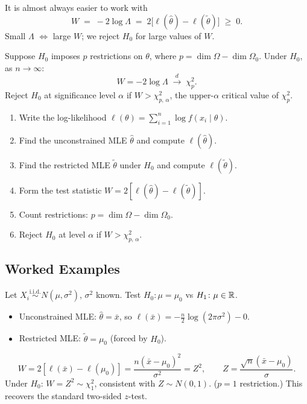 \documentclass[11pt, a4paper]{article}
\newcommand{\iid}{\overset{\text{i.i.d.}}{\sim}}
\newcommand{\dconv}{\overset{d}{\longrightarrow}}
\newcommand{\hth}{\hat{\theta}}
\newcommand{\tth}{\tilde{\theta}}
\begin{document}
\begin{warnbox}
It is almost always easier to work with
\[
  W \;=\; -2\log\Lambda \;=\; 2\bigl[\ell(\hth) - \ell(\tth)\bigr] \;\geq\; 0.
\]
Small $\Lambda$ $\Leftrightarrow$ large $W$; we reject $H_0$ for large values of $W$.
\end{warnbox}

\begin{thmbox}
Suppose $H_0$ imposes $p$ restrictions on $\theta$, where $p = \dim\Omega - \dim\Omega_0$. Under $H_0$, as $n \to \infty$:
\[
  W = -2\log\Lambda \;\dconv\; \chi^2_p.
\]
Reject $H_0$ at significance level $\alpha$ if $W > \chi^2_{p,\,\alpha}$, the upper-$\alpha$ critical value of $\chi^2_p$.
\end{thmbox}

\begin{methodbox}
\begin{enumerate}
  \item Write the log-likelihood $\ell(\theta) = \sum_{i=1}^n \log f(x_i \mid \theta)$.
  \item Find the unconstrained MLE $\hth$ and compute $\ell(\hth)$.
  \item Find the restricted MLE $\tth$ under $H_0$ and compute $\ell(\tth)$.
  \item Form the test statistic $W = 2[\ell(\hth) - \ell(\tth)]$.
  \item Count restrictions: $p = \dim\Omega - \dim\Omega_0$.
  \item Reject $H_0$ at level $\alpha$ if $W > \chi^2_{p,\,\alpha}$.
\end{enumerate}
\end{methodbox}

\subsection*{Worked Examples}

\begin{exbox}
Let $X_i \iid N(\mu, \sigma^2)$, $\sigma^2$ known. Test $H_0\colon \mu = \mu_0$ vs $H_1\colon \mu \in \mathbb{R}$.
\begin{itemize}
  \item Unconstrained MLE: $\hth = \bar{x}$, so $\ell(\bar{x}) = -\frac{n}{2}\log(2\pi\sigma^2) - 0$.
  \item Restricted MLE: $\tth = \mu_0$ (forced by $H_0$).
\end{itemize}
\[
  W = 2[\ell(\bar{x}) - \ell(\mu_0)] = \frac{n(\bar{x} - \mu_0)^2}{\sigma^2} = Z^2,
  \qquad Z = \frac{\sqrt{n}(\bar{x} - \mu_0)}{\sigma}.
\]
Under $H_0$: $W = Z^2 \sim \chi^2_1$, consistent with $Z \sim N(0,1)$. ($p = 1$ restriction.) This recovers the standard two-sided $z$-test.
\end{exbox}
\end{document}
